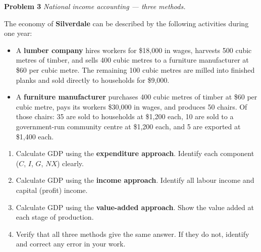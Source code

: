 \documentclass[12pt]{article}
\begin{document}
\bigskip
\newpage
\noindent\textbf{Problem 3} \quad \textit{National income accounting --- three methods.}

\medskip
The economy of \textbf{Silverdale} can be described by the following
activities during one year:

\begin{itemize}[leftmargin=1.5em,itemsep=3pt]
  \item A \textbf{lumber company} hires workers for \$18{,}000 in wages,
        harvests 500 cubic metres of timber, and sells 400 cubic metres to
        a furniture manufacturer at \$60 per cubic metre.  The remaining
        100 cubic metres are milled into finished planks and sold directly
        to households for \$9{,}000.

  \item A \textbf{furniture manufacturer} purchases 400 cubic metres of
        timber at \$60 per cubic metre, pays its workers \$30{,}000 in wages,
        and produces 50 chairs.  Of those chairs: 35 are sold to households
        at \$1{,}200 each, 10 are sold to a government-run community centre
        at \$1{,}200 each, and 5 are exported at \$1{,}400 each.
\end{itemize}

\begin{enumerate}[label=(\alph*),leftmargin=2em,itemsep=4pt]
  \item Calculate GDP using the \textbf{expenditure approach}.
        Identify each component ($C$, $I$, $G$, $NX$) clearly.

  \item Calculate GDP using the \textbf{income approach}.
        Identify all labour income and capital (profit) income.

  \item Calculate GDP using the \textbf{value-added approach}.
        Show the value added at each stage of production.

  \item Verify that all three methods give the same answer.
        If they do not, identify and correct any error in your work.
\end{enumerate}

\bigskip

\end{document}
